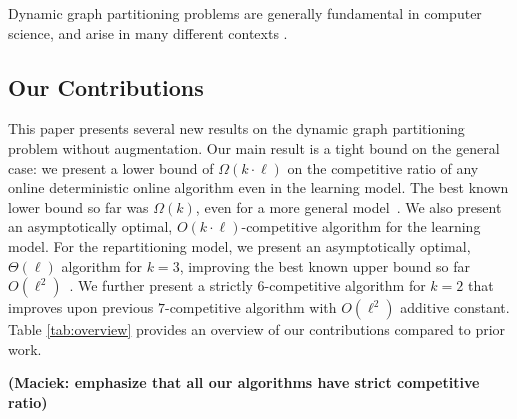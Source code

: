 \documentclass[a4paper,anonymous,USenglish]{lipics-v2019}
\newcommand\maciek[1]{\color{brown}\textbf{(Maciek: #1)}\color{black}}
\begin{document}
Dynamic graph partitioning problems are generally fundamental in computer science, and arise in many different contexts \cite{streaming-soda,streaming1}.


\subsection{Our Contributions}

This paper presents several new results on the dynamic graph partitioning problem  without augmentation.
Our main result is a tight bound on the general case: we present a lower bound of $\Omega(k\cdot\ell)$ on the competitive ratio of any online deterministic online algorithm 
even in the learning model.
The best known lower bound so far was $\Omega(k)$,
even for a more general model~\cite{repartition-disc}.
We also present an asymptotically optimal, 
$O(k\cdot \ell)$-competitive algorithm
for the learning model.
For the repartitioning model, we present  
an asymptotically optimal,
$\Theta(\ell)$ algorithm for $k=3$, improving the best known upper bound 
so far $O(\ell^2)$~\cite{repartition-disc}.
We further present a strictly $6$-competitive algorithm for $k=2$ that improves upon previous $7$-competitive algorithm with $O(\ell^2)$ additive constant.
%
Table \ref{tab:overview} provides an overview of our contributions compared to prior work.

\maciek{emphasize that all our algorithms have strict competitive ratio}
\end{document}
